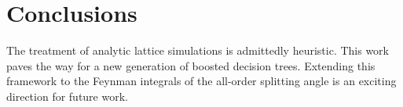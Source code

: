 \section{Conclusions}\label{sec:conclusions}

The treatment of analytic lattice simulations is admittedly heuristic.
This work paves the way for a new generation of boosted decision trees.
Extending this framework to the Feynman integrals of the all-order
splitting angle is an exciting direction for future work.

